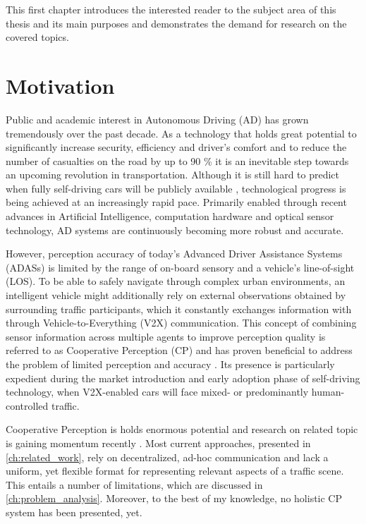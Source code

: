 This first chapter introduces the interested reader to the subject area of this thesis and its main purposes and demonstrates the demand for research on the covered topics. 

\section{Motivation}
\label{sec:motivation}
Public and academic interest in Autonomous Driving (AD) has grown tremendously over the past decade. As a technology that holds great potential to significantly increase security, efficiency and driver's comfort and to reduce the number of casualties on the road by up to 90 \% \cite{Markwalter2017} it is an inevitable step towards an upcoming revolution in transportation.
Although it is still hard to predict when fully self-driving cars will be publicly available \cite{Frost&SulivanConsulting2018}, technological progress is being achieved at an increasingly rapid pace. Primarily enabled through recent advances in Artificial Intelligence, computation hardware and optical sensor technology, AD systems are continuously becoming more robust and accurate.
\par
\bigskip

However, perception accuracy of today's Advanced Driver Assistance Systems (ADASs) is limited by the range of on-board sensory and a vehicle's line-of-sight (LOS). To be able to safely navigate through complex urban environments, an intelligent vehicle might additionally rely on external observations obtained by surrounding traffic participants, which it constantly exchanges information with through Vehicle-to-Everything (V2X) communication. This concept of combining sensor information across multiple agents to improve perception quality is referred to as Cooperative Perception (CP) and has proven beneficial to address the problem of limited perception and accuracy \cite{Chen2019, Hohm2019}. Its presence is particularly expedient during the market introduction and early adoption phase of self-driving technology, when V2X-enabled cars will face mixed- or predominantly human-controlled traffic.  
\par
\bigskip

Cooperative Perception is holds enormous potential \cite{Gunther2015} and research on related topic is gaining momentum recently \cite{Chen2019, Thandavarayan2019, Calvo2017, BMWGroup2019}. Most current approaches, presented in \cref{ch:related_work}, rely on decentralized, ad-hoc communication and lack a uniform, yet flexible format for representing relevant aspects of a traffic scene. This entails a number of limitations, which are discussed in \cref{ch:problem_analysis}. Moreover, to the best of my knowledge, no holistic CP system has been presented, yet. 
\par
\bigskip


